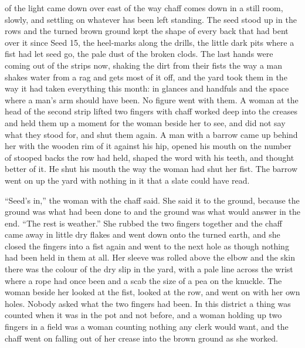 
 of the light came down over  east of  the way chaff comes down in a still room, slowly, and settling on whatever has been left standing. The seed stood up in the rows and the turned brown ground kept the shape of every back that had bent over it since Seed 15, the heel-marks along the drills, the little dark pits where a fist had let seed go, the pale dust of the broken clods. The last hands were coming out of the strips now, shaking the dirt from their fists the way a man shakes water from a rag and gets most of it off, and the yard took them in the way it had taken everything this month: in glances and handfuls and the space where a man's arm should have been. No figure went with them. A woman at the head of the second strip lifted two fingers with chaff worked deep into the creases and held them up a moment for the woman beside her to see, and did not say what they stood for, and shut them again. A man with a barrow came up behind her with the wooden rim of it against his hip, opened his mouth on the number of stooped backs the row had held, shaped the word with his teeth, and thought better of it. He shut his mouth the way the woman had shut her fist. The barrow went on up the yard with nothing in it that a slate could have read.

“Seed's in,” the woman with the chaff said. She said it to the ground, because the ground was what had been done to and the ground was what would answer in the end. “The rest is weather.” She rubbed the two fingers together and the chaff came away in little dry flakes and went down onto the turned earth, and she closed the fingers into a fist again and went to the next hole as though nothing had been held in them at all. Her sleeve was rolled above the elbow and the skin there was the colour of the dry slip in the yard, with a pale line across the wrist where a rope had once been and a scab the size of a pea on the knuckle. The woman beside her looked at the fist, looked at the row, and went on with her own holes. Nobody asked what the two fingers had been. In this district a thing was counted when it was in the pot and not before, and a woman holding up two fingers in a field was a woman counting nothing any clerk would want, and the chaff went on falling out of her crease into the brown ground as she worked.

